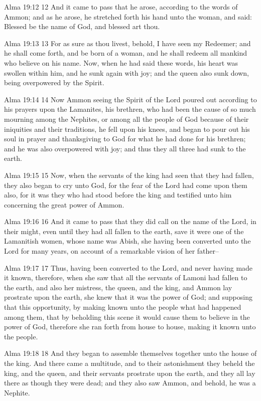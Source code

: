 Alma 19:12
 12 And it came to pass that he arose, according to the words of
Ammon; and as he arose, he stretched forth his hand unto the
woman, and said: Blessed be the name of God, and blessed art
thou.

Alma 19:13
 13 For as sure as thou livest, behold, I have seen my Redeemer;
and he shall come forth, and be born of a woman, and he shall
redeem all mankind who believe on his name. Now, when he had
said these words, his heart was swollen within him, and he sunk
again with joy; and the queen also sunk down, being overpowered
by the Spirit.

Alma 19:14
 14 Now Ammon seeing the Spirit of the Lord poured out according
to his prayers upon the Lamanites, his brethren, who had been the
cause of so much mourning among the Nephites, or among all the
people of God because of their iniquities and their traditions,
he fell upon his knees, and began to pour out his soul in prayer
and thanksgiving to God for what he had done for his brethren;
and he was also overpowered with joy; and thus they all three had
sunk to the earth.

Alma 19:15
 15 Now, when the servants of the king had seen that they had
fallen, they also began to cry unto God, for the fear of the Lord
had come upon them also, for it was they who had stood before the
king and testified unto him concerning the great power of Ammon.

Alma 19:16
 16 And it came to pass that they did call on the name of the
Lord, in their might, even until they had all fallen to the
earth, save it were one of the Lamanitish women, whose name was
Abish, she having been converted unto the Lord for many years, on
account of a remarkable vision of her father--

Alma 19:17
 17 Thus, having been converted to the Lord, and never having
made it known, therefore, when she saw that all the servants of
Lamoni had fallen to the earth, and also her mistress, the queen,
and the king, and Ammon lay prostrate upon the earth, she knew
that it was the power of God; and supposing that this
opportunity, by making known unto the people what had happened
among them, that by beholding this scene it would cause them to
believe in the power of God, therefore she ran forth from house
to house, making it known unto the people.

Alma 19:18
 18 And they began to assemble themselves together unto the house
of the king. And there came a multitude, and to their
astonishment they beheld the king, and the queen, and their
servants prostrate upon the earth, and they all lay there as
though they were dead; and they also saw Ammon, and behold, he
was a Nephite.

